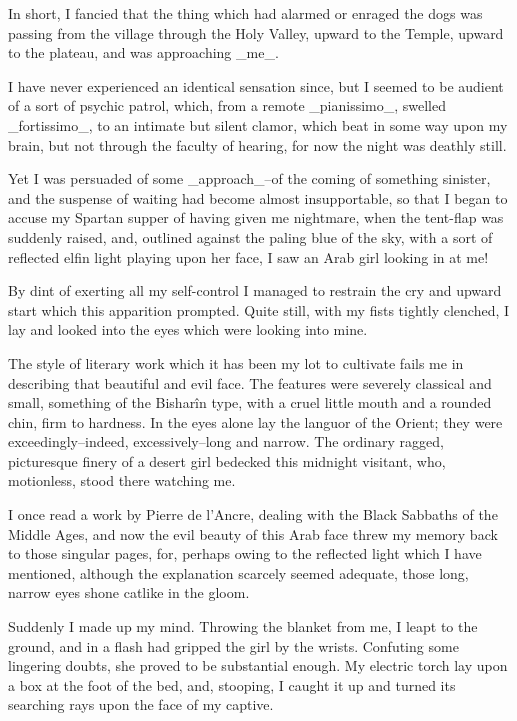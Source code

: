 In short, I fancied that the thing which had alarmed or enraged the
dogs was passing from the village through the Holy Valley, upward
to the Temple, upward to the plateau, and was approaching _me_.

I have never experienced an identical sensation since, but I seemed
to be audient of a sort of psychic patrol, which, from a remote
_pianissimo_, swelled _fortissimo_, to an intimate but silent clamor,
which beat in some way upon my brain, but not through the faculty of
hearing, for now the night was deathly still.

Yet I was persuaded of some _approach_--of the coming of something
sinister, and the suspense of waiting had become almost insupportable,
so that I began to accuse my Spartan supper of having given me
nightmare, when the tent-flap was suddenly raised, and, outlined
against the paling blue of the sky, with a sort of reflected elfin
light playing upon her face, I saw an Arab girl looking in at me!

By dint of exerting all my self-control I managed to restrain the cry
and upward start which this apparition prompted. Quite still, with my
fists tightly clenched, I lay and looked into the eyes which were
looking into mine.

The style of literary work which it has been my lot to cultivate fails
me in describing that beautiful and evil face. The features were
severely classical and small, something of the Bisharîn type, with a
cruel little mouth and a rounded chin, firm to hardness. In the eyes
alone lay the languor of the Orient; they were exceedingly--indeed,
excessively--long and narrow. The ordinary ragged, picturesque finery
of a desert girl bedecked this midnight visitant, who, motionless,
stood there watching me.

I once read a work by Pierre de l'Ancre, dealing with the Black
Sabbaths of the Middle Ages, and now the evil beauty of this Arab face
threw my memory back to those singular pages, for, perhaps owing to
the reflected light which I have mentioned, although the explanation
scarcely seemed adequate, those long, narrow eyes shone catlike in the
gloom.

Suddenly I made up my mind. Throwing the blanket from me, I leapt to
the ground, and in a flash had gripped the girl by the wrists.
Confuting some lingering doubts, she proved to be substantial enough.
My electric torch lay upon a box at the foot of the bed, and,
stooping, I caught it up and turned its searching rays upon the face
of my captive.

